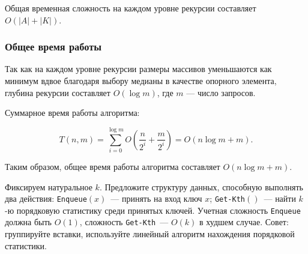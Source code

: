 \documentclass[11pt]{article}
\begin{document}
\begin{solution}
    Общая временная сложность на каждом уровне рекурсии составляет $O(|A| + |K|)$.

    \subsubsection*{Общее время работы}

    Так как на каждом уровне рекурсии размеры массивов уменьшаются как минимум вдвое благодаря выбору медианы в качестве опорного элемента, глубина рекурсии составляет $O(\log m)$, где $m$ — число запросов.

    Суммарное время работы алгоритма:

    \[
        T(n, m) = \sum_{i=0}^{\log m} O\left( \frac{n}{2^i} + \frac{m}{2^i} \right) = O(n \log m + m).
    \]

    Таким образом, общее время работы алгоритма составляет $O(n \log m + m)$.

\end{solution}

\begin{problem}{25}
Фиксируем натуральное $k$.
Предложите структуру данных, способную выполнять два действия: \texttt{Enqueue}$(x)$~--- принять на вход ключ $x$; \texttt{Get-Kth}$()$~---
найти $k$-ю порядковую статистику среди принятых ключей. Учетная сложность \texttt{Enqueue} должна быть $O(1)$,
сложность \texttt{Get-Kth}~--- $O(k)$ в худшем случае.
Совет: группируйте вставки, используйте линейный алгоритм нахождения порядковой статистики.
\end{problem}
\end{document}
